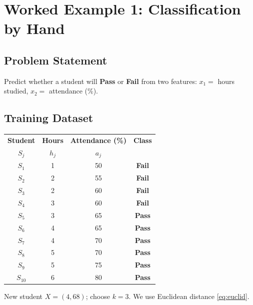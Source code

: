 \documentclass[11pt,a4paper]{report}
\newcommand{\classpass}{\textbf{\textcolor{cteal}{Pass}}}
\newcommand{\classfail}{\textbf{\textcolor{ccoral}{Fail}}}
\theoremstyle{definition}
\theoremstyle{remark}
\begin{document}
	\chapter{Worked Example 1: Classification by Hand}
	\label{ch:classify}
	
	\section{Problem Statement}
	Predict whether a student will \classpass{} or \classfail{} from two features:
	$x_1=$ hours studied, $x_2=$ attendance (\%).
	
	\section{Training Dataset}
	\begin{center}
		\renewcommand{\arraystretch}{1.2}
		\begin{tabular}{c c c c}
			\toprule
			\textbf{Student} & \textbf{Hours} & \textbf{Attendance (\%)} & \textbf{Class}\\
			$S_{j}$ & $h_{j}$ & $a_{j}$ & \\
			\midrule
			$S_{1}$  & 1 & 50 & \classfail\\
			$S_{2}$  & 2 & 55 & \classfail\\
			$S_{3}$  & 2 & 60 & \classfail\\
			$S_{4}$  & 3 & 60 & \classfail\\
			$S_{5}$  & 3 & 65 & \classpass\\
			$S_{6}$  & 4 & 65 & \classpass\\
			$S_{7}$  & 4 & 70 & \classpass\\
			$S_{8}$  & 5 & 70 & \classpass\\
			$S_{9}$  & 5 & 75 & \classpass\\
			$S_{10}$ & 6 & 80 & \classpass\\
			\bottomrule
		\end{tabular}
	\end{center}
	New student $X=(4,68)$; choose $k=3$. We use Euclidean distance
	\eqref{eq:euclid}.
	
\end{document}
